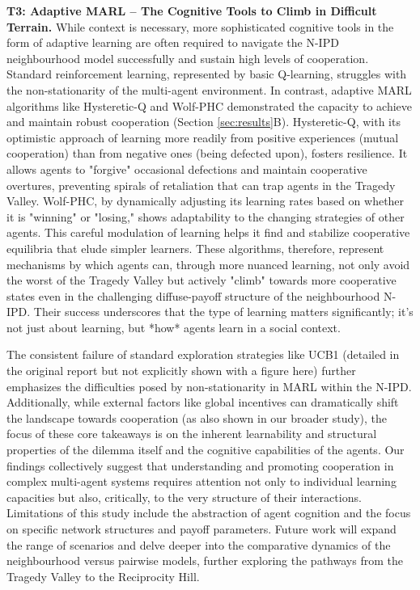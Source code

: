 \documentclass[]{llncs} %
\begin{document}
\textbf{T3: Adaptive MARL – The Cognitive Tools to Climb in Difficult Terrain.}
While context is necessary, more sophisticated cognitive tools in the form of adaptive learning are often required to navigate the N-IPD neighbourhood model successfully and sustain high levels of cooperation. Standard reinforcement learning, represented by basic Q-learning, struggles with the non-stationarity of the multi-agent environment. In contrast, adaptive MARL algorithms like Hysteretic-Q and Wolf-PHC demonstrated the capacity to achieve and maintain robust cooperation (Section \ref{sec:results}B).
Hysteretic-Q, with its optimistic approach of learning more readily from positive experiences (mutual cooperation) than from negative ones (being defected upon), fosters resilience. It allows agents to "forgive" occasional defections and maintain cooperative overtures, preventing spirals of retaliation that can trap agents in the Tragedy Valley.
Wolf-PHC, by dynamically adjusting its learning rates based on whether it is "winning" or "losing," shows adaptability to the changing strategies of other agents. This careful modulation of learning helps it find and stabilize cooperative equilibria that elude simpler learners.
These algorithms, therefore, represent mechanisms by which agents can, through more nuanced learning, not only avoid the worst of the Tragedy Valley but actively "climb" towards more cooperative states even in the challenging diffuse-payoff structure of the neighbourhood N-IPD. Their success underscores that the type of learning matters significantly; it's not just about learning, but *how* agents learn in a social context.

The consistent failure of standard exploration strategies like UCB1 (detailed in the original report but not explicitly shown with a figure here) further emphasizes the difficulties posed by non-stationarity in MARL within the N-IPD. Additionally, while external factors like global incentives can dramatically shift the landscape towards cooperation (as also shown in our broader study), the focus of these core takeaways is on the inherent learnability and structural properties of the dilemma itself and the cognitive capabilities of the agents.
Our findings collectively suggest that understanding and promoting cooperation in complex multi-agent systems requires attention not only to individual learning capacities but also, critically, to the very structure of their interactions. Limitations of this study include the abstraction of agent cognition and the focus on specific network structures and payoff parameters. Future work will expand the range of scenarios and delve deeper into the comparative dynamics of the neighbourhood versus pairwise models, further exploring the pathways from the Tragedy Valley to the Reciprocity Hill.
\end{document}
